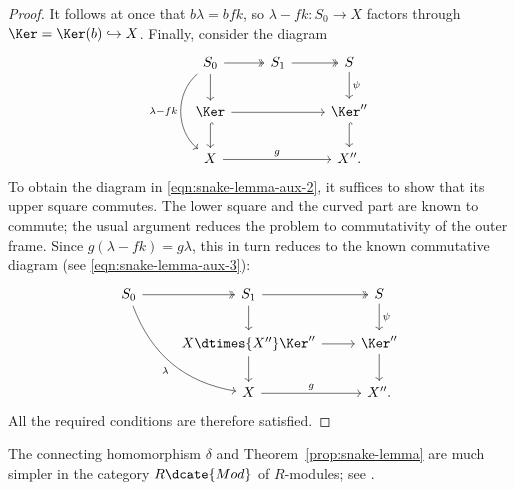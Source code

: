 \begin{proof}
	It follows at once that $b\lambda=bfk$, so
	$\lambda-fk:S_0\to X$ factors through $\Ker=\Ker(b)\hookrightarrow X$.
	Finally, consider the diagram
	\[\begin{tikzcd}
		S_0 \arrow[twoheadrightarrow, r] \arrow[d] \arrow[dd, bend right=50, "{\lambda -fk}"'] & S_1 \arrow[twoheadrightarrow, r] & S \arrow[d, "\psi"] \\
		\Ker \arrow[hookrightarrow, d] \arrow[rr] & & \Ker'' \arrow[hookrightarrow, d] \\
		X \arrow[rr, "g"] & & X'' .
	\end{tikzcd}\]
	To obtain the diagram in \eqref{eqn:snake-lemma-aux-2}, it suffices to show
	that its upper square commutes. The lower square and the curved part are
	known to commute; the usual argument reduces the problem to commutativity of
	the outer frame. Since $g(\lambda-fk)=g\lambda$, this in turn reduces to the
	known commutative diagram (see \eqref{eqn:snake-lemma-aux-3}):
	\[\begin{tikzcd}
		S_0 \arrow[twoheadrightarrow, r] \arrow[rdd, bend right, "\lambda"'] & S_1 \arrow[twoheadrightarrow, r] \arrow[d] & S \arrow[d, "\psi"] \\
		& X \dtimes{X''} \Ker'' \arrow[r] \arrow[d] & \Ker'' \arrow[d] \\
		& X \arrow[r, "g"] & X'' .
	\end{tikzcd}\]
	All the required conditions are therefore satisfied.
\end{proof}

The connecting homomorphism $\delta$ and Theorem~\ref{prop:snake-lemma} are
much simpler in the category $R\dcate{Mod}$ of $R$-modules; see
\cite[Proposition 6.8.6]{Li1}.

